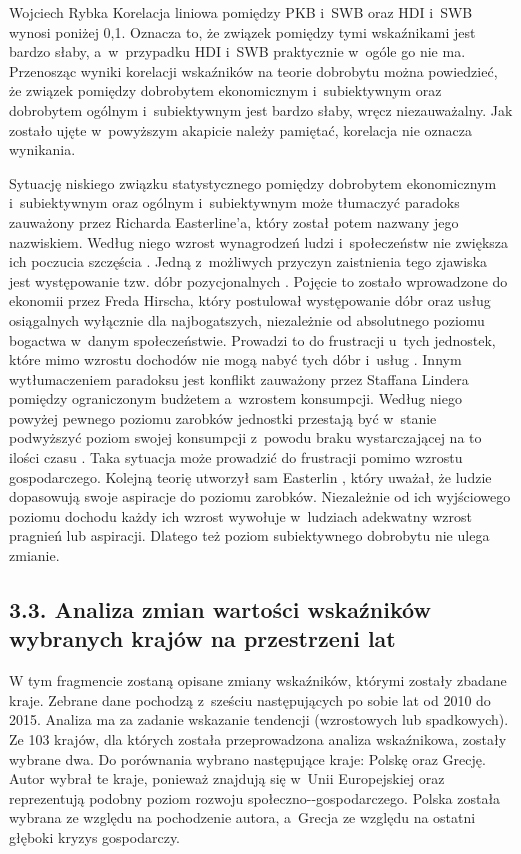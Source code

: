 \begin{artplenv}{Wojciech Rybka}
Korelacja liniowa pomiędzy PKB i~SWB oraz HDI i~SWB wynosi poniżej 0,1. Oznacza to, że związek pomiędzy tymi wskaźnikami
jest bardzo słaby, a~w~przypadku HDI i~SWB praktycznie w~ogóle go nie ma. Przenosząc wyniki korelacji wskaźników na
teorie dobrobytu można powiedzieć, że związek pomiędzy dobrobytem ekonomicznym i~subiektywnym oraz dobrobytem
ogólnym i~subiektywnym jest bardzo słaby, wręcz niezauważalny. Jak zostało ujęte w~powyższym akapicie należy pamiętać,
korelacja nie oznacza wynikania. 

Sytuację niskiego związku statystycznego pomiędzy dobrobytem ekonomicznym  i~subiektywnym oraz ogólnym i~subiektywnym
może tłumaczyć paradoks zauważony przez Richarda Easterline'a, który został potem nazwany jego nazwiskiem. Według niego
wzrost wynagrodzeń ludzi i~społeczeństw nie zwiększa ich poczucia szczęścia
\parencite{czapinski_ekonomia_2012}.
Jedną z~możliwych przyczyn zaistnienia tego zjawiska jest występowanie tzw. dóbr pozycjonalnych
\parencite{ostrowski_czy_2012}.
Pojęcie to zostało wprowadzone do ekonomii przez Freda Hirscha, który
postulował występowanie dóbr oraz usług osiągalnych wyłącznie dla najbogatszych, niezależnie od absolutnego poziomu
bogactwa w~danym społeczeństwie. Prowadzi to do frustracji u~tych jednostek, które mimo wzrostu dochodów nie mogą nabyć
tych dóbr i~usług
\parencite{hirsch_social_2005}.
Innym wytłumaczeniem paradoksu jest konflikt zauważony przez
Staffana Lindera pomiędzy ograniczonym budżetem a~wzrostem konsumpcji. Według niego powyżej pewnego poziomu zarobków
jednostki przestają być w~stanie podwyższyć poziom swojej konsumpcji z~powodu braku wystarczającej na to ilości czasu
\parencite{linder_harried_1970}.
Taka sytuacja może prowadzić do frustracji pomimo wzrostu gospodarczego.
Kolejną teorię utworzył sam Easterlin
\parencite*{easterlin_income_2001},
który uważał, że ludzie dopasowują swoje
aspiracje do poziomu zarobków. Niezależnie od ich wyjściowego poziomu dochodu każdy ich wzrost wywołuje w~ludziach
adekwatny wzrost pragnień lub aspiracji. Dlatego też poziom subiektywnego dobrobytu nie ulega zmianie.

\subsection{3.3. Analiza zmian wartości wskaźników wybranych krajów na przestrzeni lat}
W tym fragmencie zostaną opisane zmiany wskaźników, którymi zostały zbadane kraje. Zebrane dane pochodzą z~sześciu
następujących po sobie lat od 2010 do 2015. Analiza ma za zadanie wskazanie tendencji (wzrostowych lub spadkowych). Ze
103 krajów, dla których została przeprowadzona analiza wskaźnikowa, zostały wybrane dwa. Do porównania wybrano
następujące kraje: Polskę oraz Grecję. Autor wybrał te kraje, ponieważ znajdują się w~Unii Europejskiej oraz
reprezentują podobny poziom rozwoju społeczno-\mbox{-gospodarczego}. Polska została wybrana ze względu na pochodzenie autora,
a~Grecja ze względu na ostatni głęboki kryzys gospodarczy. 


\end{artplenv}
